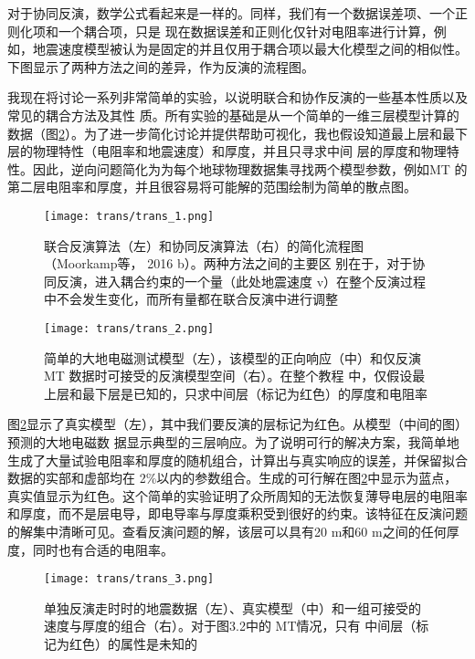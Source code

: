 对于协同反演，数学公式看起来是一样的。同样，我们有一个数据误差项、一个正则化项和一个耦合项，只是 现在数据误差和正则化仅针对电阻率进行计算，例如，地震速度模型被认为是固定的并且仅用于耦合项以最大化模型之间的相似性。下图显示了两种方法之间的差异，作为反演的流程图。

我现在将讨论一系列非常简单的实验，以说明联合和协作反演的一些基本性质以及常见的耦合方法及其性 质。所有实验的基础是从一个简单的一维三层模型计算的数据（图\ref{trans2}）。为了进一步简化讨论并提供帮助可视化，我也假设知道最上层和最下层的物理特性（电阻率和地震速度）和厚度，并且只寻求中间 层的厚度和物理特性。因此，逆向问题简化为为每个地球物理数据集寻找两个模型参数，例如MT 的第二层电阻率和厚度，并且很容易将可能解的范围绘制为简单的散点图。

\begin{figure}
    \centering
    \texttt{[image: trans/trans\_1.png]}
    \caption[]{联合反演算法（左）和协同反演算法（右）的简化流程图（Moorkamp等， 2016 b）。两种方法之间的主要区 别在于，对于协同反演，进入耦合约束的一个量（此处地震速度 v）在整个反演过程中不会发生变化，而所有量都在联合反演中进行调整} \label{trans1}
\end{figure}

\begin{figure}
    \centering
    \texttt{[image: trans/trans\_2.png]}
    \caption[]{简单的大地电磁测试模型（左），该模型的正向响应（中）和仅反演 MT 数据时可接受的反演模型空间（右）。在整个教程 中，仅假设最上层和最下层是已知的，只求中间层（标记为红色）的厚度和电阻率} \label{trans2}
\end{figure}

图\ref{trans2}显示了真实模型（左），其中我们要反演的层标记为红色。从模型（中间的图）预测的大地电磁数 据显示典型的三层响应。为了说明可行的解决方案，我简单地生成了大量试验电阻率和厚度的随机组合，计算出与真实响应的误差，并保留拟合数据的实部和虚部均在 2\%以内的参数组合。生成的可行解在图\ref{trans2}中显示为蓝点，真实值显示为红色。这个简单的实验证明了众所周知的无法恢复薄导电层的电阻率和厚度，而不是层电导，即电导率与厚度乘积受到很好的约束。该特征在反演问题的解集中清晰可见。查看反演问题的解，该层可以具有20 m和60 m之间的任何厚度，同时也有合适的电阻率。

\begin{figure}[H]
    \centering
    \texttt{[image: trans/trans\_3.png]}
    \caption[]{单独反演走时时的地震数据（左）、真实模型（中）和一组可接受的速度与厚度的组合（右）。对于图3.2中的 MT情况，只有 中间层（标记为红色）的属性是未知的} \label{trans3}
\end{figure}

